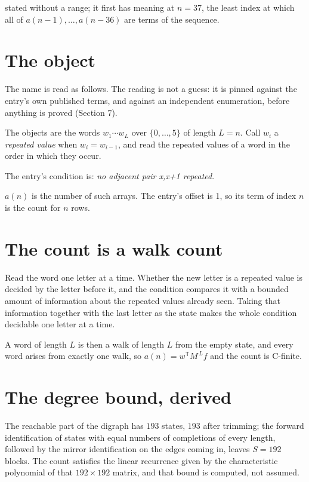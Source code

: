 \documentclass[11pt]{article}
\theoremstyle{definition}
\begin{document}
stated without a range; it first has meaning at $n = 37$, the least index at which all of $a(n-1),\dots,a(n-36)$ are terms of the sequence.

\section{The object}

The name is read as follows. The reading is not a guess: it is pinned against the entry's own published terms, and against an independent enumeration, before anything is proved (Section 7).

The objects are the words $w_1\cdots w_L$ over $\{0,\dots,5\}$ of length $L = n$. Call $w_i$ a {\itshape repeated value} when $w_i = w_{i-1}$, and read the repeated values of a word in the order in which they occur.

The entry's condition is: {\itshape no adjacent pair x,x+1 repeated}.

$a(n)$ is the number of such arrays. The entry's offset is 1, so its term of index $n$ is the count for $n$ rows.

\section{The count is a walk count}

Read the word one letter at a time. Whether the new letter is a repeated value is decided by the letter before it, and the condition compares it with a bounded amount of information about the repeated values already seen. Taking that information together with the last letter as the state makes the whole condition decidable one letter at a time.

A word of length $L$ is then a walk of length $L$ from the empty state, and every word arises from exactly one walk, so $a(n) = w^{\mathsf T}M^{\,L}f$ and the count is C-finite.

\section{The degree bound, derived}

The reachable part of the digraph has $193$ states, $193$ after trimming; the forward identification of states with equal numbers of completions of every length, followed by the mirror identification on the edges coming in, leaves $S = 192$ blocks. The count satisfies the linear recurrence given by the characteristic polynomial of that $192\times192$ matrix, and that bound is computed, not assumed.
\end{document}
